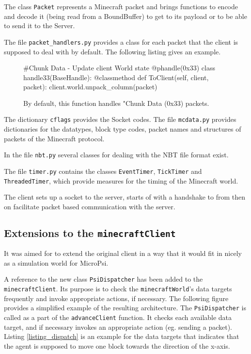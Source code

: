 The class \texttt{Packet} represents a Minecraft packet and brings functions to encode and decode it (being read from a BoundBuffer) to get to its payload or to be able to send it to the Server.

The file \texttt{packet\_handlers.py} provides a class for each packet that the client is supposed to deal with by default. The following listing gives an example.


		\begin{figure}[ht]
			\centering
			\begin{minipage}{11cm}
				\begin{pseudocode}
#Chunk Data - Update client World state
@phandle(0x33)
class handle33(BaseHandle):
	@classmethod
	def ToClient(self, client, packet):
		client.world.unpack_column(packet)
					\end{pseudocode}
				\caption{By default, this function handles "Chunk Data (0x33) packets.}
				\label{packet_handling}
			\end{minipage}
		\end{figure}

The dictionary \texttt{cflags} provides the Socket codes.
The file \texttt{mcdata.py} provides dictionaries for the datatypes, block type codes, packet names and structures of packets of the Minecraft protocol.

In the file \texttt{nbt.py} several classes for dealing with the NBT file format exist.

The file \texttt{timer.py} contains the classes \texttt{EventTimer}, \texttt{TickTimer} and \texttt{ThreadedTimer}, which provide measures for the timing of the Minecraft world.

The client sets up a socket to the server, starts of with a handshake to from then on facilitate packet based communication with the server.

        \subsection{Extensions to the \texttt{minecraftClient}}
It was aimed for to extend the original client in a way that it would fit in nicely as a simulation world for MicroPsi.
        
A reference to the new class \texttt{PsiDispatcher} has been added to the \texttt{minecraftClient}. Its purpose is to check the \texttt{minecraftWorld}'s data targets frequently and invoke appropriate actions, if necessary. The following figure provides a simplified example of the resulting architecture. The \texttt{PsiDispatcher} is called as a part of the \texttt{advanceClient} function. It checks each available data target, and if necessary invokes an appropriate action (eg. sending a packet). Listing \ref{listing_dispatch} is an example for the data targets that indicates that the agent is supposed to move one block towards the direction of the x-axis. %

